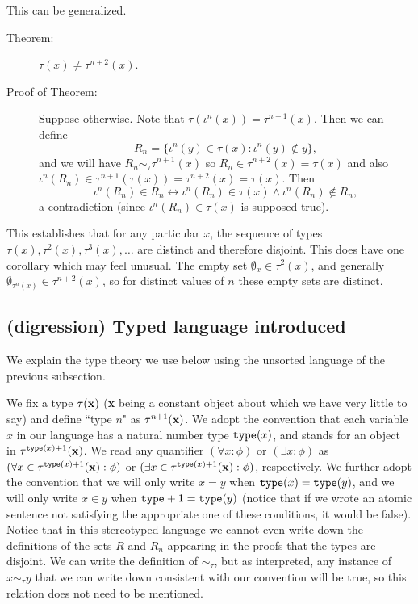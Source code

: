 \documentclass[12pt]{book}
\begin{document}
This can be generalized.

\begin{description}

\item[Theorem:]  $\tau(x) \neq \tau^{n+2}(x)$.

\item[Proof of Theorem:]  Suppose otherwise.  Note that $\tau(\iota^n(x)) = \tau^{n+1}(x)$.  Then we can define $$R_n = \{\iota^n(y) \in \tau(x):\iota^n(y) \not\in y\},$$ and we will have $R_n \sim_\tau \tau^{n+1}(x)$ so $R_n \in \tau^{n+2}(x) = \tau(x)$ and also $\iota^n(R_n) \in \tau^{n+1}(\tau(x)) = \tau^{n+2}(x) = \tau(x)$.
Then $$\iota^n(R_n) \in R_n \leftrightarrow \iota^n(R_n) \in \tau(x) \wedge \iota^n(R_n) \not\in R_n,$$ a contradiction (since $\iota^n(R_n) \in \tau(x)$ is supposed true). 

\end{description}

This establishes that for any particular $x$, the sequence of types $\tau(x), \tau^2(x),\tau^3(x),\ldots$ are distinct and therefore disjoint.  This does have one corollary which may feel unusual.  The empty set $\emptyset_x \in \tau^2(x)$, and generally $\emptyset_{\tau^n(x)} \in \tau^{n+2}(x)$, so for distinct values of $n$ these empty sets are distinct.

\subsection{ (digression) Typed language introduced}

We explain the type theory we use below using the unsorted language of the previous subsection.

We fix a type $\tau({\bf x})$ ({\bf x} being a constant object about which we have very little to say) and define ``type $n$" as $\tau^{n+1}({\bf x})$.  We adopt the convention that each variable $x$ in our language has a natural number type ${\tt type}(x)$,
and stands for an object in $\tau^{{\tt type}(x)+1}({\bf x})$.
We read any quantifier $(\forall x:\phi)$ or $(\exists x:\phi)$ as $(\forall x\in \tau^{{\tt type}(x)+1}({\bf x}):\phi)$ or $(\exists x\in \tau^{{\tt type}(x)+1}({\bf x}):\phi)$, respectively.
We further adopt the convention that we will only write $x=y$ when ${\tt type}(x)={\tt type}(y)$, and we will only write $x \in y$ when ${\tt type}+1 = {\tt type}(y)$
(notice that if we wrote an atomic sentence not satisfying the appropriate one of these conditions, it would be false).  Notice that in this stereotyped language we cannot even write down the definitions of the sets $R$ and $R_n$ appearing in the proofs that the types are disjoint.  We can write the definition of $\sim_\tau$, but as interpreted, any instance
of $x \sim_\tau y$ that we can write down consistent with our convention will be true, so this relation does not need to be mentioned.
\end{document}
